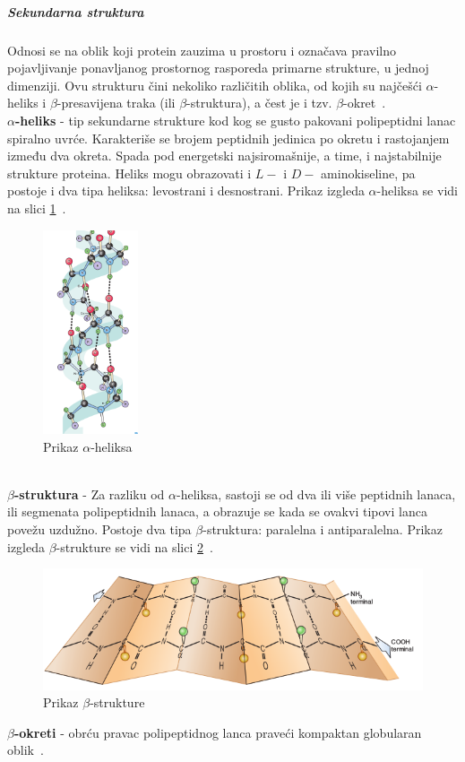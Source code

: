 \subparagraph{Sekundarna struktura}
Odnosi se na oblik koji protein zauzima u prostoru i označava pravilno pojavljivanje ponavljanog prostornog rasporeda primarne strukture, u jednoj dimenziji. Ovu strukturu čini nekoliko različitih oblika, od kojih su najčešći $\alpha$-heliks i $\beta$-presavijena traka (ili $\beta$-struktura), a čest je i tzv. $\beta$-okret~\cite{spasic,medbio}.\\
\textbf{$\alpha$-heliks} - tip sekundarne strukture kod kog se gusto pakovani polipeptidni lanac spiralno uvrće. Karakteriše se brojem peptidnih jedinica po okretu i rastojanjem između dva okreta. Spada pod energetski najsiromašnije, a time, i najstabilnije strukture proteina. Heliks mogu obrazovati i $L-$ i $D-$ aminokiseline, pa postoje i dva tipa heliksa: levostrani i desnostrani. Prikaz izgleda $\alpha$-heliksa se vidi na slici \ref{fig:aheliks}~\cite{spasic}.
\begin{figure}[h]
	\centering
    \includegraphics[width=0.25\textwidth]{Figures/BO/ahelix.png}
    \caption{Prikaz $\alpha$-heliksa~\cite{bmbg}}
    \label{fig:aheliks}
\end{figure}
 \\
\textbf{$\beta$-struktura} - Za razliku od $\alpha$-heliksa, sastoji se od dva ili više peptidnih lanaca, ili segmenata polipeptidnih lanaca, a obrazuje se kada se ovakvi tipovi lanca povežu uzdužno. Postoje dva tipa $\beta$-struktura: paralelna i antiparalelna. Prikaz izgleda $\beta$-strukture se vidi na slici \ref{fig:beta}~\cite{spasic}.\\

\begin{figure}[h]
	\centering
    \includegraphics[width=1\textwidth]{Figures/BO/beta.png}
    \caption{Prikaz $\beta$-strukture~\cite{bmbg}}
    \label{fig:beta}
\end{figure}
\textbf{$\beta$-okreti} - obrću pravac polipeptidnog lanca praveći kompaktan globularan oblik~\cite{lippincott}. 
 
